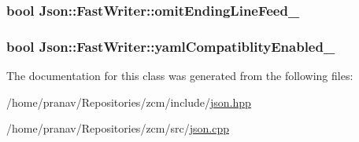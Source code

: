 \subsubsection[{\texorpdfstring{omit\+Ending\+Line\+Feed\+\_\+}{omitEndingLineFeed_}}]{\setlength{\rightskip}{0pt plus 5cm}bool Json\+::\+Fast\+Writer\+::omit\+Ending\+Line\+Feed\+\_\+\hspace{0.3cm}{\ttfamily [private]}}\hypertarget{classJson_1_1FastWriter_abd6e13851db6dcf59d84af68d48d50ac}{}\label{classJson_1_1FastWriter_abd6e13851db6dcf59d84af68d48d50ac}
\subsubsection[{\texorpdfstring{yaml\+Compatiblity\+Enabled\+\_\+}{yamlCompatiblityEnabled_}}]{\setlength{\rightskip}{0pt plus 5cm}bool Json\+::\+Fast\+Writer\+::yaml\+Compatiblity\+Enabled\+\_\+\hspace{0.3cm}{\ttfamily [private]}}\hypertarget{classJson_1_1FastWriter_a4c4c1911179bf472d24492915b0e489a}{}\label{classJson_1_1FastWriter_a4c4c1911179bf472d24492915b0e489a}


The documentation for this class was generated from the following files\+:\begin{DoxyCompactItemize}
\item 
/home/pranav/\+Repositories/zcm/include/\hyperlink{json_8hpp}{json.\+hpp}\item 
/home/pranav/\+Repositories/zcm/src/\hyperlink{json_8cpp}{json.\+cpp}\end{DoxyCompactItemize}
